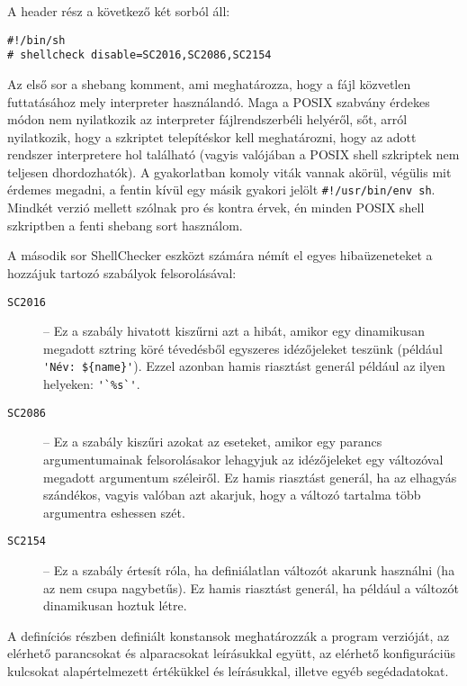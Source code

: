 \documentclass[
]{elteikthesis}[2025/03/25]
\begin{document}
A header rész a következő két sorból áll:

\begin{verbatim}
#!/bin/sh
# shellcheck disable=SC2016,SC2086,SC2154
\end{verbatim}

Az első sor a shebang komment, ami meghatározza, hogy a fájl közvetlen futtatásához mely interpreter használandó.
Maga a POSIX szabvány érdekes módon nem nyilatkozik az interpreter fájlrendszerbéli helyéről,
sőt, arról nyilatkozik, hogy a szkriptet telepítéskor kell meghatározni,
hogy az adott rendszer interpretere hol található
(vagyis valójában a POSIX shell szkriptek nem teljesen dhordozhatók).
A gyakorlatban komoly viták vannak akörül, végülis mit érdemes megadni,
a fentin kívül egy másik gyakori jelölt \verb|#!/usr/bin/env sh|.
Mindkét verzió mellett szólnak pro és kontra érvek,
én minden POSIX shell szkriptben a fenti shebang sort használom.

A második sor ShellChecker eszközt számára némít el egyes hibaüzeneteket
a hozzájuk tartozó szabályok felsorolásával:

\begin{description}
    \item[\texttt{SC2016}] --
        Ez a szabály hivatott kiszűrni azt a hibát, amikor egy dinamikusan megadott sztring köré
        tévedésből egyszeres idézőjeleket teszünk
        (például \verb|'Név: ${name}'|).
        Ezzel azonban hamis riasztást generál például az ilyen helyeken: \verb|'`%s`'|.
    \item[\texttt{SC2086}] --
        Ez a szabály kiszűri azokat az eseteket, amikor egy parancs argumentumainak felsorolásakor
        lehagyjuk az idézőjeleket egy változóval megadott argumentum széleiről.
        Ez hamis riasztást generál, ha az elhagyás szándékos,
        vagyis valóban azt akarjuk, hogy a változó tartalma több argumentra eshessen szét.
    \item[\texttt{SC2154}] --
        Ez a szabály értesít róla, ha definiálatlan változót akarunk használni (ha az nem csupa nagybetűs).
        Ez hamis riasztást generál, ha például a változót dinamikusan hoztuk létre.
\end{description}

A definíciós részben definiált konstansok meghatározzák a program verzióját,
az elérhető parancsokat és alparacsokat leírásukkal együtt,
az elérhető konfiguráciüs kulcsokat alapértelmezett értékükkel és leírásukkal,
illetve egyéb segédadatokat.
\end{document}
